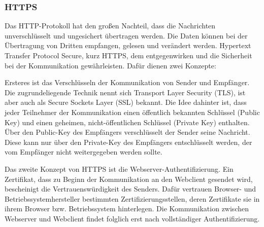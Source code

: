 \subsubsection{HTTPS}
Das HTTP-Protokoll hat den großen Nachteil, dass die Nachrichten unverschlüsselt und ungesichert übertragen werden. Die Daten können bei der Übertragung von Dritten empfangen, gelesen und verändert werden. Hypertext Transfer Protocol Secure, kurz HTTPS, dem entgegenwirken und die Sicherheit bei der Kommunikation gewährleisten. Dafür dienen zwei Konzepte:
\newline

Ersteres ist das Verschlüsseln der Kommunikation von Sender und Empfänger. Die zugrundeliegende Technik nennt sich Transport Layer Security (TLS), ist aber auch als Secure Sockets Layer (SSL) bekannt. Die Idee dahinter ist, dass jeder Teilnehmer der Kommunikation einen öffentlich bekannten Schlüssel (Public Key) und einen geheimen, nicht-öffentlichen Schlüssel (Private Key) enthalten. Über den Public-Key des Empfängers verschlüsselt der Sender seine Nachricht. Diese kann nur über den Private-Key des Empfängers entschlüsselt werden, der vom Empfänger nicht weitergegeben werden sollte.
\newline

Das zweite Konzept von HTTPS ist die Webserver-Authentifizierung. Ein Zertifikat, dass zu Beginn der Kommunikation an den Webclient gesendet wird, bescheinigt die Vertrauenswürdigkeit des Senders. Dafür vertrauen Browser- und Betriebssystemhersteller bestimmten Zertifizierungsstellen, deren Zertifikate sie in ihrem Browser bzw. Betriebssystem hinterlegen. Die Kommunikation zwischen Webserver und Webclient findet folglich erst nach vollständiger Authentifizierung.
